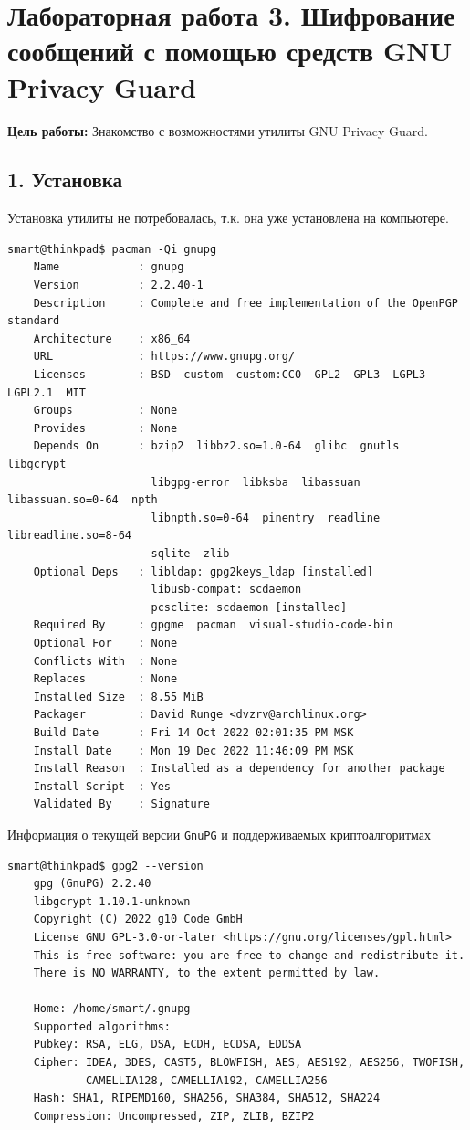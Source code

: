 \chapter*{Лабораторная работа 3. Шифрование сообщений с помощью средств GNU Privacy Guard}

\textbf{Цель работы:} Знакомство с возможностями утилиты GNU Privacy Guard.

\section*{1. Установка}
Установка утилиты не потребовалась, т.к. она уже установлена на компьютере.
\begin{Verbatim}[frame=single]
    smart@thinkpad$ pacman -Qi gnupg
    Name            : gnupg
    Version         : 2.2.40-1
    Description     : Complete and free implementation of the OpenPGP standard
    Architecture    : x86_64
    URL             : https://www.gnupg.org/
    Licenses        : BSD  custom  custom:CC0  GPL2  GPL3  LGPL3  LGPL2.1  MIT
    Groups          : None
    Provides        : None
    Depends On      : bzip2  libbz2.so=1.0-64  glibc  gnutls  libgcrypt
                      libgpg-error  libksba  libassuan  libassuan.so=0-64  npth
                      libnpth.so=0-64  pinentry  readline  libreadline.so=8-64
                      sqlite  zlib
    Optional Deps   : libldap: gpg2keys_ldap [installed]
                      libusb-compat: scdaemon
                      pcsclite: scdaemon [installed]
    Required By     : gpgme  pacman  visual-studio-code-bin
    Optional For    : None
    Conflicts With  : None
    Replaces        : None
    Installed Size  : 8.55 MiB
    Packager        : David Runge <dvzrv@archlinux.org>
    Build Date      : Fri 14 Oct 2022 02:01:35 PM MSK
    Install Date    : Mon 19 Dec 2022 11:46:09 PM MSK
    Install Reason  : Installed as a dependency for another package
    Install Script  : Yes
    Validated By    : Signature
\end{Verbatim}

Информация о текущей версии \texttt{GnuPG} и поддерживаемых криптоалгоритмах
\begin{Verbatim}[frame=single]
    smart@thinkpad$ gpg2 --version
    gpg (GnuPG) 2.2.40
    libgcrypt 1.10.1-unknown
    Copyright (C) 2022 g10 Code GmbH
    License GNU GPL-3.0-or-later <https://gnu.org/licenses/gpl.html>
    This is free software: you are free to change and redistribute it.
    There is NO WARRANTY, to the extent permitted by law.

    Home: /home/smart/.gnupg
    Supported algorithms:
    Pubkey: RSA, ELG, DSA, ECDH, ECDSA, EDDSA
    Cipher: IDEA, 3DES, CAST5, BLOWFISH, AES, AES192, AES256, TWOFISH,
            CAMELLIA128, CAMELLIA192, CAMELLIA256
    Hash: SHA1, RIPEMD160, SHA256, SHA384, SHA512, SHA224
    Compression: Uncompressed, ZIP, ZLIB, BZIP2
\end{Verbatim}

